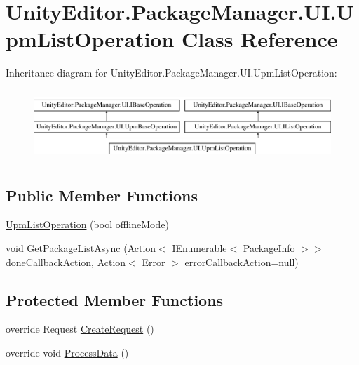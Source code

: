 \hypertarget{class_unity_editor_1_1_package_manager_1_1_u_i_1_1_upm_list_operation}{}\section{Unity\+Editor.\+Package\+Manager.\+U\+I.\+Upm\+List\+Operation Class Reference}
\label{class_unity_editor_1_1_package_manager_1_1_u_i_1_1_upm_list_operation}
Inheritance diagram for Unity\+Editor.\+Package\+Manager.\+U\+I.\+Upm\+List\+Operation\+:\begin{figure}[H]
\begin{center}
\leavevmode
\includegraphics[height=2.692308cm]{class_unity_editor_1_1_package_manager_1_1_u_i_1_1_upm_list_operation}
\end{center}
\end{figure}
\subsection*{Public Member Functions}
\begin{DoxyCompactItemize}
\item 
\mbox{\hyperlink{class_unity_editor_1_1_package_manager_1_1_u_i_1_1_upm_list_operation_ad32ec291d1522c46987ea8f25bbe30bc}{Upm\+List\+Operation}} (bool offline\+Mode)
\item 
void \mbox{\hyperlink{class_unity_editor_1_1_package_manager_1_1_u_i_1_1_upm_list_operation_a0e8627929664d10a9c5ad1d1a328f375}{Get\+Package\+List\+Async}} (Action$<$ I\+Enumerable$<$ \mbox{\hyperlink{class_unity_editor_1_1_package_manager_1_1_u_i_1_1_package_info}{Package\+Info}} $>$$>$ done\+Callback\+Action, Action$<$ \mbox{\hyperlink{class_unity_editor_1_1_package_manager_1_1_u_i_1_1_upm_base_operation_a116dcc466d587905084e826b47f7e05b}{Error}} $>$ error\+Callback\+Action=null)
\end{DoxyCompactItemize}
\subsection*{Protected Member Functions}
\begin{DoxyCompactItemize}
\item 
override Request \mbox{\hyperlink{class_unity_editor_1_1_package_manager_1_1_u_i_1_1_upm_list_operation_a6bde4381207e9b9eb75c2d9bb40e412a}{Create\+Request}} ()
\item 
override void \mbox{\hyperlink{class_unity_editor_1_1_package_manager_1_1_u_i_1_1_upm_list_operation_ae7434ca3a6b01a299d8a9860dbd32832}{Process\+Data}} ()
\end{DoxyCompactItemize}
